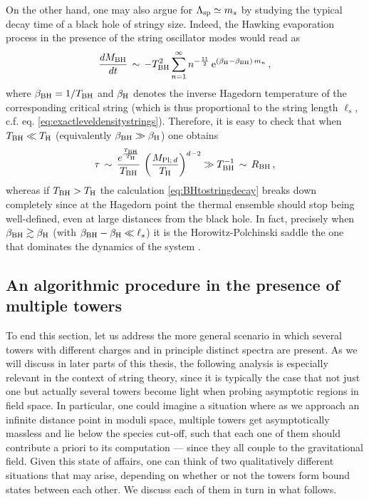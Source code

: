 On the other hand, one may also argue for $\Lambda_{\text{sp}} \simeq m_s$ by studying the typical decay time of a black hole of stringy size. Indeed, the Hawking evaporation process in the presence of the string oscillator modes would read as
%
\begin{equation}\label{eq:BHtostringdecay}
    \frac{d M_{\rm BH}}{d t}\, \sim\, - T_{\rm BH}^2\sum_{n=1}^{\infty}n^{-\frac{11}{2}}\, {\rm e}^{\left(\beta_{\rm H}-\beta_{\rm BH}\right)\, m_n}\, ,
\end{equation}
%
where $\beta_{\rm BH} = 1/T_{\rm BH}$ and $\beta_{\rm H}$ denotes the inverse Hagedorn temperature of the corresponding critical string (which is thus proportional to the string length $\ell_s$, c.f. eq. \eqref{eq:exactleveldensitystrings}). Therefore, it is easy to check that when $T_{\rm BH} \ll T_{\rm H}$ (equivalently $\beta_{\rm BH} \gg \beta_{\rm H}$) one obtains
%
\begin{equation}
    \tau\, \sim\, \frac{e^{\frac{T_{\rm BH}}{T_{\rm H}}}}{T_{\rm BH}}\, \left( \frac{M_{\text{Pl;}\, d}}{T_{\rm H}}\right)^{d-2} \gg T_{\rm BH}^{-1}\, \sim\, R_{\rm BH}\, ,
\end{equation}
%
whereas if $T_{\rm BH} > T_{\rm H}$ the calculation \eqref{eq:BHtostringdecay} breaks down completely since at the Hagedorn point the thermal ensemble should stop being well-defined, even at large distances from the black hole. In fact, precisely when $\beta_{\rm BH} \gtrsim \beta_{\rm H}$ (with $\beta_{\rm BH}-\beta_{\rm H} \ll \ell_s$) it is the Horowitz-Polchinski saddle the one that dominates the dynamics of the system \cite{Horowitz:1997jc}.


\subsection{An algorithmic procedure in the presence of multiple towers}
\label{ss:MultipleTowers}

To end this section, let us address the more general scenario in which several towers with different charges and in principle distinct spectra are present. As we will discuss in later parts of this thesis, the following analysis is especially relevant in the context of string theory, since it is typically the case that not just one but actually several towers become light when probing asymptotic regions in field space. In particular, one could imagine a situation where as we approach an infinite distance point in moduli space, multiple towers get asymptotically massless and lie below the species cut-off, such that each one of them should contribute a priori to its computation --- since they all couple to the gravitational field. Given this state of affairs, one can think of two qualitatively different situations that may arise, depending on whether or not the towers form bound states between each other. We discuss each of them in turn in what follows.
	
